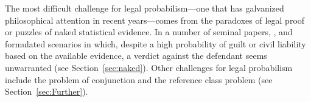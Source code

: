 \documentclass{article}
\begin{document}
%
The most difficult  challenge for legal probabilism---one that has galvanized philosophical attention in recent years---comes from the paradoxes of legal proof or puzzles of naked statistical evidence. In  a number of seminal papers, \cite{Nesson1979Reasonable-doub}, \cite{Cohen81} and \cite{Thomson86}  formulated  scenarios in which, despite a high probability of guilt or civil liability based on the available evidence, a verdict against the defendant seems unwarranted 
(see Section~\ref{sec:naked}).
Other challenges for legal probabilism include the problem of conjunction and the reference class problem  (see Section~\ref{sec:Further}).%
\end{document}
